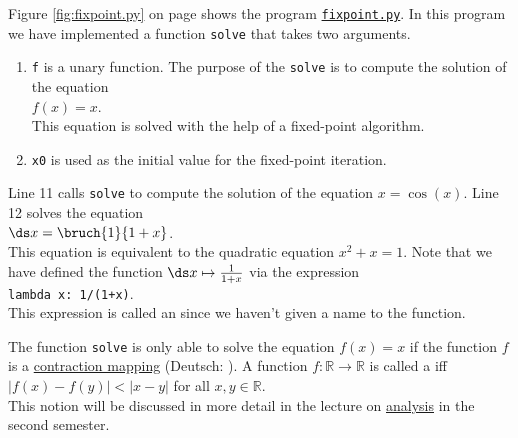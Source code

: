 Figure \ref{fig:fixpoint.py} on page \pageref{fig:fixpoint.py} shows the program
\href{https://github.com/karlstroetmann/Logic/blob/master/Python/fixpoint.py}{\texttt{fixpoint.py}}.
In this program we have implemented a function \texttt{solve} that takes two arguments.
\begin{enumerate}
\item \texttt{f} is a unary function.  The purpose of the \texttt{solve} is to compute the solution of the equation
      \\[0.2cm]
      \hspace*{1.3cm}
      $f(x) = x$.
      \\[0.2cm]
      This equation is solved with the help of a fixed-point algorithm.
\item \texttt{x0} is used as the initial value for the fixed-point iteration.
\end{enumerate}
Line 11 calls \texttt{solve} to compute the solution of the equation $x = \cos(x)$.
Line 12 solves the equation 
\\[0.2cm]
\hspace*{1.3cm}
$\ds x = \bruch{1}{1+x}$. 
\\[0.2cm]
This equation is equivalent to the quadratic equation $x^2 + x = 1$.  Note that we have defined the function
 $\ds x \mapsto \frac{1}{1+x}$ via the expression
 \\[0.2cm]
\hspace*{1.3cm}
\texttt{lambda x: 1/(1+x)}.
\\[0.2cm]
This expression is called an  
since we haven't given a name to the function.  

\remarkEng
The function \texttt{solve} is only able to solve the equation $f(x) = x$ if the function $f$ is a 
\href{https://en.wikipedia.org/wiki/Contraction_mapping}{contraction mapping} (Deutsch: ). 
  A function 
$f:\mathbb{R} \rightarrow \mathbb{R}$
is called a  iff 
\\[0.2cm]
\hspace*{1.3cm}
$|f(x) - f(y)| < |x - y|$ \quad for all $x,y \in \mathbb{R}$.
\\[0.2cm]
This notion will be discussed in more detail in the lecture on 
\href{https://github.com/karlstroetmann/Analysis/blob/master/Skript/analysis.pdf}{analysis} in the second
semester. \eox  

